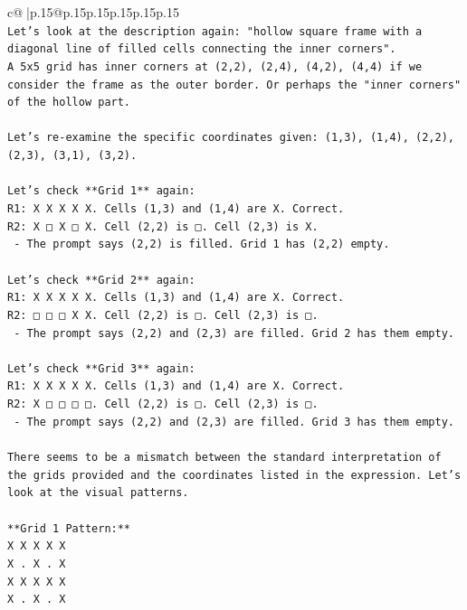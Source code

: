 \documentclass{article}
\begin{document}
{\begin{supertabular}{c@{$\;$}|p{.15\linewidth}@{}p{.15\linewidth}p{.15\linewidth}p{.15\linewidth}p{.15\linewidth}p{.15\linewidth}}
{{{\\ 
\texttt{Let's look at the description again: "hollow square frame with a diagonal line of filled cells connecting the inner corners".} \\
\texttt{A 5x5 grid has inner corners at (2,2), (2,4), (4,2), (4,4) if we consider the frame as the outer border. Or perhaps the "inner corners" of the hollow part.} \\
\\ 
\texttt{Let's re{-}examine the specific coordinates given: (1,3), (1,4), (2,2), (2,3), (3,1), (3,2).} \\
\\ 
\texttt{Let's check **Grid 1** again:} \\
\texttt{R1: X X X X X. Cells (1,3) and (1,4) are X. Correct.} \\
\texttt{R2: X □ X □ X. Cell (2,2) is □. Cell (2,3) is X.} \\
\texttt{   {-} The prompt says (2,2) is filled. Grid 1 has (2,2) empty.} \\
\\ 
\texttt{Let's check **Grid 2** again:} \\
\texttt{R1: X X X X X. Cells (1,3) and (1,4) are X. Correct.} \\
\texttt{R2: □ □ □ X X. Cell (2,2) is □. Cell (2,3) is □.} \\
\texttt{   {-} The prompt says (2,2) and (2,3) are filled. Grid 2 has them empty.} \\
\\ 
\texttt{Let's check **Grid 3** again:} \\
\texttt{R1: X X X X X. Cells (1,3) and (1,4) are X. Correct.} \\
\texttt{R2: X □ □ □ □. Cell (2,2) is □. Cell (2,3) is □.} \\
\texttt{   {-} The prompt says (2,2) and (2,3) are filled. Grid 3 has them empty.} \\
\\ 
\texttt{There seems to be a mismatch between the standard interpretation of the grids provided and the coordinates listed in the expression. Let's look at the visual patterns.} \\
\\ 
\texttt{**Grid 1 Pattern:**} \\
\texttt{X X X X X} \\
\texttt{X . X . X} \\
\texttt{X X X X X} \\
\texttt{X . X . X} \\
}}}
\end{supertabular}}
\end{document}

